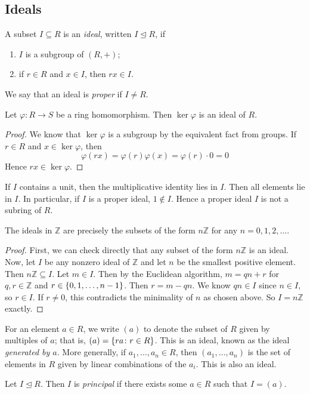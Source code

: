 \subsection{Ideals}
\begin{definition}
	A subset \( I \subseteq R \) is an \textit{ideal}, written \( I \trianglelefteq R \), if
	\begin{enumerate}
		\item \( I \) is a subgroup of \( (R, +) \);
		\item if \( r \in R \) and \( x \in I \), then \( rx \in I \).
	\end{enumerate}
	We say that an ideal is \textit{proper} if \( I \neq R \).
\end{definition}
\begin{lemma}
	Let \( \varphi \colon R \to S \) be a ring homomorphism.
	Then \( \ker \varphi \) is an ideal of \( R \).
\end{lemma}
\begin{proof}
	We know that \( \ker \varphi \) is a subgroup by the equivalent fact from groups.
	If \( r \in R \) and \( x \in \ker \varphi \), then
	\[
		\varphi(rx) = \varphi(r) \varphi(x) = \varphi(r) \cdot 0 = 0
	\]
	Hence \( rx \in \ker \varphi \).
\end{proof}
\begin{remark}
	If \( I \) contains a unit, then the multiplicative identity lies in \( I \).
	Then all elements lie in \( I \).
	In particular, if \( I \) is a proper ideal, \( 1 \not\in I \).
	Hence a proper ideal \( I \) is not a subring of \( R \).
\end{remark}
\begin{lemma}
	The ideals in \( \mathbb Z \) are precisely the subsets of the form \( n\mathbb Z \) for any \( n = 0, 1, 2, \dots \).
\end{lemma}
\begin{proof}
	First, we can check directly that any subset of the form \( n\mathbb Z \) is an ideal.
	Now, let \( I \) be any nonzero ideal of \( \mathbb Z \) and let \( n \) be the smallest positive element.
	Then \( n\mathbb Z \subseteq I \).
	Let \( m \in I \).
	Then by the Euclidean algorithm, \( m = qn+r \) for \( q,r \in \mathbb Z \) and \( r \in \qty{0, 1, \dots, n-1} \).
	Then \( r = m - qn \).
	We know \( qn \in I \) since \( n \in I \), so \( r \in I \).
	If \( r \neq 0 \), this contradicts the minimality of \( n \) as chosen above.
	So \( I = n\mathbb Z \) exactly.
\end{proof}
\begin{definition}
	For an element \( a \in R \), we write \( (a) \) to denote the subset of \( R \) given by multiples of \( a \); that is, \( (a) = \qty{ra \colon r\in R} \).
	This is an ideal, known as the ideal \textit{generated by \( a \)}.
	More generally, if \( a_1, \dots, a_n \in R \), then \( (a_1, \dots, a_n) \) is the set of elements in \( R \) given by linear combinations of the \( a_i \).
	This is also an ideal.
\end{definition}
\begin{definition}
	Let \( I \trianglelefteq R \).
	Then \( I \) is \textit{principal} if there exists some \( a \in R \) such that \( I = (a) \).
\end{definition}

